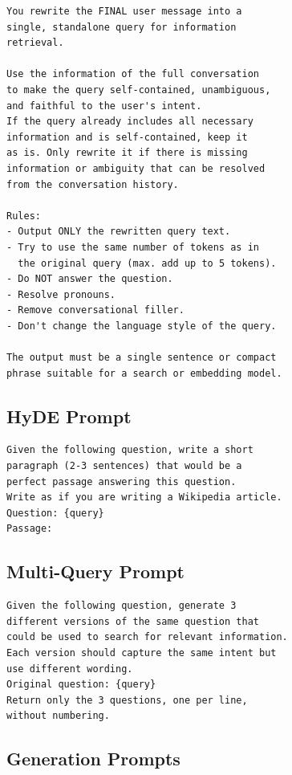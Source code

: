 \documentclass[11pt]{article}
\begin{document}
\begin{lstlisting}[basicstyle=\scriptsize\ttfamily, breaklines=true, frame=single, numbers=none]
You rewrite the FINAL user message into a
single, standalone query for information
retrieval.

Use the information of the full conversation
to make the query self-contained, unambiguous,
and faithful to the user's intent.
If the query already includes all necessary
information and is self-contained, keep it
as is. Only rewrite it if there is missing
information or ambiguity that can be resolved
from the conversation history.

Rules:
- Output ONLY the rewritten query text.
- Try to use the same number of tokens as in
  the original query (max. add up to 5 tokens).
- Do NOT answer the question.
- Resolve pronouns.
- Remove conversational filler.
- Don't change the language style of the query.

The output must be a single sentence or compact
phrase suitable for a search or embedding model.
\end{lstlisting}

\subsection{HyDE Prompt}

\begin{lstlisting}[basicstyle=\scriptsize\ttfamily, breaklines=true, frame=single, numbers=none]
Given the following question, write a short
paragraph (2-3 sentences) that would be a
perfect passage answering this question.
Write as if you are writing a Wikipedia article.
Question: {query}
Passage:
\end{lstlisting}

\subsection{Multi-Query Prompt}

\begin{lstlisting}[basicstyle=\scriptsize\ttfamily, breaklines=true, frame=single, numbers=none]
Given the following question, generate 3
different versions of the same question that
could be used to search for relevant information.
Each version should capture the same intent but
use different wording.
Original question: {query}
Return only the 3 questions, one per line,
without numbering.
\end{lstlisting}

\subsection{Generation Prompts }
\label{apx:generation}
\end{document}
